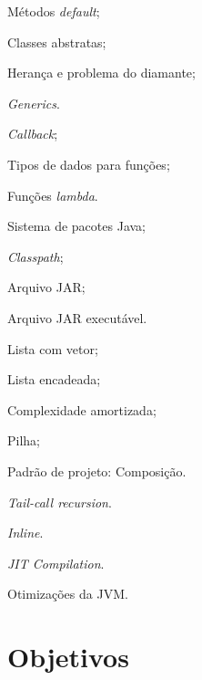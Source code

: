 \documentclass{article}
\begin{document}
\begin{itemize*}[label={}]
    \item[] Métodos \textit{default};
    \item[] Classes abstratas;
    \item[] Herança e problema do diamante;
    \item[] \textit{Generics}.
    \item[] \textit{Callback};
    \item[] Tipos de dados para funções;
    \item[] Funções \textit{lambda}.
    \item[] Sistema de pacotes Java;
    \item[] \textit{Classpath};
    \item[] Arquivo JAR\@;
    \item[] Arquivo JAR executável.
    \item[] Lista com vetor;
    \item[] Lista encadeada;
    \item[] Complexidade amortizada;
    \item[] Pilha;
    \item[] Padrão de projeto: Composição.
    \item[] \textit{Tail-call recursion}.
    \item[] \textit{Inline}.
    \item[] \textit{JIT Compilation}.
    \item[] Otimizações da JVM\@.
\end{itemize*}

\section{Objetivos}
\end{document}

